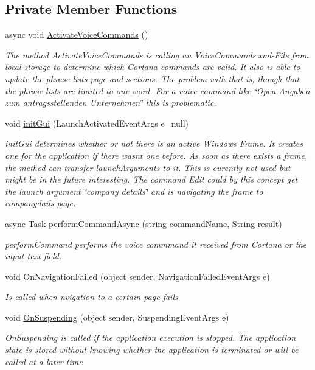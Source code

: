 \subsection*{Private Member Functions}
\begin{DoxyCompactItemize}
\item 
async void \hyperlink{class_listen_to_me_1_1_app_ac79758b58c56c49b87a3e2ff6a9ad638}{Activate\+Voice\+Commands} ()
\begin{DoxyCompactList}\small\item\em The method Activate\+Voice\+Commands is calling an Voice\+Commands.\+xml-\/\+File from local storage to determine which Cortana commands are valid. It also is able to update the phrase lists page and sections. The problem with that is, though that the phrase lists are limited to one word. For a voice command like \char`\"{}\+Open \textquotesingle{}\+Angaben zum antragsstellenden Unternehmen\textquotesingle{}\char`\"{} this is problematic. \end{DoxyCompactList}\item 
void \hyperlink{class_listen_to_me_1_1_app_ad23d27a2bdcd858e10e589bfadb1db17}{init\+Gui} (Launch\+Activated\+Event\+Args e=null)
\begin{DoxyCompactList}\small\item\em init\+Gui determines whether or not there is an active Windows Frame. It creates one for the application if there wasn\textquotesingle{}t one before. As soon as there exists a frame, the method can transfer launch\+Arguments to it. This is curently not used but might be in the future interesting. The command Edit could by this concept get the launch argument \char`\"{}company details\char`\"{} and is navigating the frame to companydails page. \end{DoxyCompactList}\item 
async Task \hyperlink{class_listen_to_me_1_1_app_a53f967dbeb997202786db199d54f279f}{perform\+Command\+Async} (string command\+Name, String result)
\begin{DoxyCompactList}\small\item\em perform\+Command performs the voice commmand it received from Cortana or the input text field. \end{DoxyCompactList}\item 
void \hyperlink{class_listen_to_me_1_1_app_a8867647372e101bdd100a68eab4d0d3a}{On\+Navigation\+Failed} (object sender, Navigation\+Failed\+Event\+Args e)
\begin{DoxyCompactList}\small\item\em Is called when nvigation to a certain page fails \end{DoxyCompactList}\item 
void \hyperlink{class_listen_to_me_1_1_app_adc9d18402a7a696ca6d4a7631a610e8d}{On\+Suspending} (object sender, Suspending\+Event\+Args e)
\begin{DoxyCompactList}\small\item\em On\+Suspending is called if the application execution is stopped. The application state is stored without knowing whether the application is terminated or will be called at a later time \end{DoxyCompactList}\end{DoxyCompactItemize}
